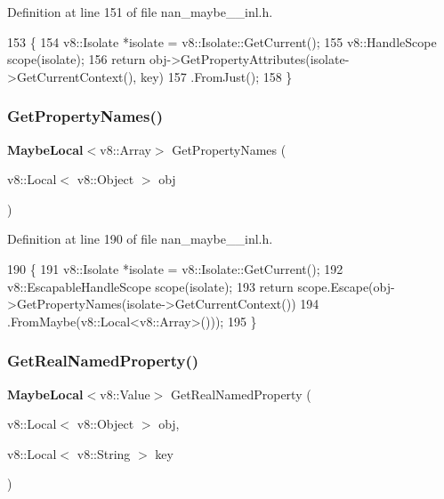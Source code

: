 Definition at line 151 of file nan\+\_\+maybe\+\_\+\_\+inl.\+h.


\begin{DoxyCode}
153                           \{
154   v8::Isolate *isolate = v8::Isolate::GetCurrent();
155   v8::HandleScope scope(isolate);
156   \textcolor{keywordflow}{return} obj->GetPropertyAttributes(isolate->GetCurrentContext(), key)
157       .FromJust();
158 \}
\end{DoxyCode}
\mbox{\label{nan__maybe__43__inl_8h_aa97117d992e7fcf01532a7ab501ea4b2}} 
\subsubsection{Get\+Property\+Names()}
{\footnotesize\ttfamily \textbf{ Maybe\+Local}$<$v8\+::\+Array$>$ Get\+Property\+Names (\begin{DoxyParamCaption}\item[{v8\+::\+Local$<$ v8\+::\+Object $>$}]{obj }\end{DoxyParamCaption})}



Definition at line 190 of file nan\+\_\+maybe\+\_\+\_\+inl.\+h.


\begin{DoxyCode}
190                                                             \{
191   v8::Isolate *isolate = v8::Isolate::GetCurrent();
192   v8::EscapableHandleScope scope(isolate);
193   \textcolor{keywordflow}{return} scope.Escape(obj->GetPropertyNames(isolate->GetCurrentContext())
194                           .FromMaybe(v8::Local<v8::Array>()));
195 \}
\end{DoxyCode}
\mbox{\label{nan__maybe__43__inl_8h_aeab586c1e0352d8b1c2283a91956ba58}} 
\subsubsection{Get\+Real\+Named\+Property()}
{\footnotesize\ttfamily \textbf{ Maybe\+Local}$<$v8\+::\+Value$>$ Get\+Real\+Named\+Property (\begin{DoxyParamCaption}\item[{v8\+::\+Local$<$ v8\+::\+Object $>$}]{obj,  }\item[{v8\+::\+Local$<$ v8\+::\+String $>$}]{key }\end{DoxyParamCaption})}



